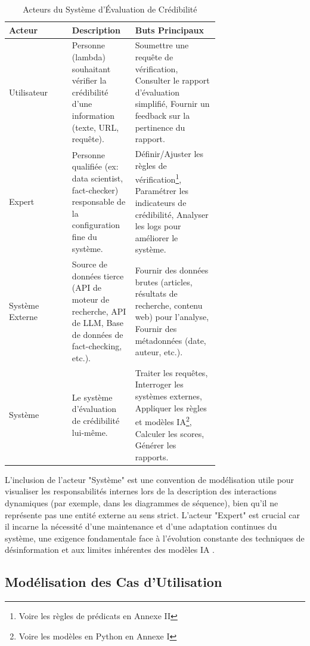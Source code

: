 \documentclass[9pt,twocolumn,french]{article}
\begin{document}
\begin{table}[h!]
  \centering
  \caption{Acteurs du Système d'Évaluation de Crédibilité}
  \label{tab:acteurs}
  \begin{tabular}{@{}lp{0.3\linewidth}p{0.4\linewidth}@{}}
    \toprule
    Acteur & Description & Buts Principaux \\
    \midrule
    Utilisateur & Personne (lambda) souhaitant vérifier la crédibilité d'une information (texte, URL, requête). & Soumettre une requête de vérification, Consulter le rapport d'évaluation simplifié, Fournir un feedback sur la pertinence du rapport. \\
    \addlinespace
    Expert & Personne qualifiée (ex: data scientist, fact-checker) responsable de la configuration fine du système. & Définir/Ajuster les règles de vérification\footnote{Voire les règles de prédicats en Annexe II}, Paramétrer les indicateurs de crédibilité, Analyser les logs pour améliorer le système. \\
    \addlinespace
    Système Externe & Source de données tierce (API de moteur de recherche, API de LLM, Base de données de fact-checking, etc.). & Fournir des données brutes (articles, résultats de recherche, contenu web) pour l'analyse, Fournir des métadonnées (date, auteur, etc.). \\
    \addlinespace
    Système & Le système d'évaluation de crédibilité lui-même. & Traiter les requêtes, Interroger les systèmes externes, Appliquer les règles et modèles IA\footnote{Voire les modèles en Python en Annexe I}, Calculer les scores, Générer les rapports. \\
    \bottomrule
  \end{tabular}
\end{table}

L'inclusion de l'acteur "Système" est une convention de modélisation utile pour visualiser les responsabilités internes lors de la description des interactions dynamiques (par exemple, dans les diagrammes de séquence), bien qu'il ne représente pas une entité externe au sens strict. L'acteur "Expert" est crucial car il incarne la nécessité d'une maintenance et d'une adaptation continues du système, une exigence fondamentale face à l'évolution constante des techniques de désinformation et aux limites inhérentes des modèles IA \citep{Nabozny2021, Loth2024, Zhou2022A}.

\subsection{Modélisation des Cas d'Utilisation}
\end{document}

